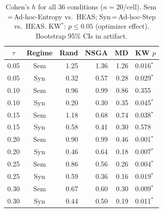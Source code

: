 \begin{table}[tbp]
\centering
\setlength{\tabcolsep}{3pt}
\scriptsize
\caption{Cohen's $h$ for all 36 conditions ($n\!=\!20$/cell).
  Sem\,=\,Ad-hoc-Entropy vs.\ HEAS; Syn\,=\,Ad-hoc-Step vs.\ HEAS.
  KW$^*$: $p\!\leq\!0.05$ (optimizer effect). Bootstrap 95\% CIs in artifact.}
\label{tab:cohen_h_ci}
\begin{tabular}{ccrrrp{1.2cm}}
\toprule
$\tau$ & Regime & Rand & NSGA & MD & KW $p$ \\
\midrule
0.05 & Sem & 1.25 & 1.36 & 1.26 & 0.016$^*$ \\
0.05 & Syn & 0.32 & 0.57 & 0.28 & 0.029$^*$ \\
0.10 & Sem & 0.96 & 0.99 & 0.86 & 0.355 \\
0.10 & Syn & 0.20 & 0.30 & 0.35 & 0.045$^*$ \\
0.15 & Sem & 1.18 & 0.68 & 0.74 & 0.038$^*$ \\
0.15 & Syn & 0.58 & 0.41 & 0.30 & 0.578 \\
0.20 & Sem & 0.90 & 0.99 & 0.46 & 0.001$^*$ \\
0.20 & Syn & 0.46 & 0.64 & 0.18 & 0.007$^*$ \\
0.25 & Sem & 0.86 & 0.56 & 0.26 & 0.004$^*$ \\
0.25 & Syn & 0.59 & 0.36 & 0.16 & 0.019$^*$ \\
0.30 & Sem & 0.67 & 0.60 & 0.30 & 0.009$^*$ \\
0.30 & Syn & 0.44 & 0.50 & 0.19 & 0.011$^*$ \\
\bottomrule
\end{tabular}
\end{table}
